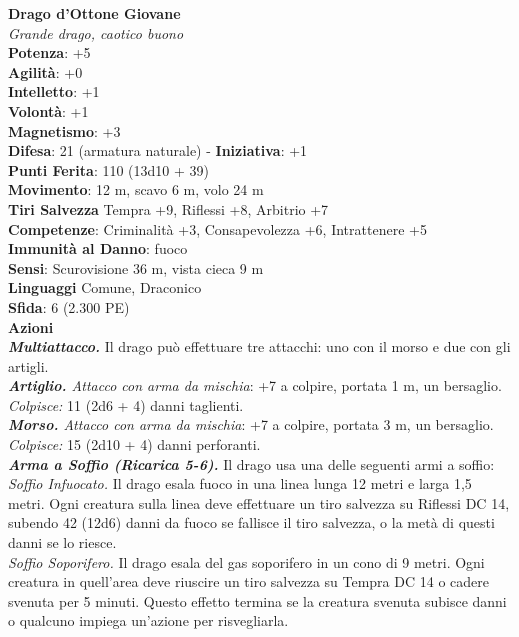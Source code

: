 \begin{multicols}{2}
\medskip\textbf{Drago d'Ottone Giovane}\\
\emph{Grande drago, caotico buono}\\
\textbf{Potenza}: +5\\
\textbf{Agilità}: +0\\
\textbf{Intelletto}: +1\\
\textbf{Volontà}: +1\\
\textbf{Magnetismo}: +3\\
\textbf{Difesa}: 21 (armatura naturale) - \textbf{Iniziativa}: +1\\
\textbf{Punti Ferita}: 110 (13d10 + 39)\\
\textbf{Movimento}: 12 m, scavo 6 m, volo 24 m\\
\textbf{Tiri Salvezza} Tempra +9, Riflessi +8, Arbitrio +7\\
\textbf{Competenze}: Criminalità +3, Consapevolezza +6, Intrattenere +5\\
\textbf{Immunità al Danno}: fuoco\\
\textbf{Sensi}: Scurovisione 36 m, vista cieca 9 m\\
\textbf{Linguaggi} Comune, Draconico\\
\textbf{Sfida}: 6 (2.300 PE)\smallskip\\
\smallskip\textbf{Azioni}\\
\emph{\textbf{Multiattacco.}} Il drago può effettuare tre attacchi: uno con il morso e due con gli artigli.\\
\emph{\textbf{Artiglio.} Attacco con arma da mischia}: +7 a colpire, portata 1 m, un bersaglio.\\
\emph{Colpisce:} 11 (2d6 + 4) danni taglienti.\\
\emph{\textbf{Morso.} Attacco con arma da mischia}: +7 a colpire, portata 3 m, un bersaglio.\\
\emph{Colpisce:} 15 (2d10 + 4) danni perforanti.\\
\emph{\textbf{Arma a Soffio (Ricarica 5-6).}} Il drago usa una delle seguenti armi a soffio:\\
\emph{Soffio Infuocato.} Il drago esala fuoco in una linea lunga 12 metri e larga 1,5 metri. Ogni creatura sulla linea deve effettuare un tiro salvezza su Riflessi DC 14, subendo 42 (12d6) danni da fuoco se fallisce il tiro salvezza, o la metà di questi danni se lo riesce.\\
\emph{Soffio Soporifero.} Il drago esala del gas soporifero in un cono di 9 metri. Ogni creatura in quell'area deve riuscire un tiro salvezza su Tempra DC 14 o cadere svenuta per 5 minuti. Questo effetto termina se la creatura svenuta subisce danni o qualcuno impiega un'azione per risvegliarla.\\

\end{multicols}
